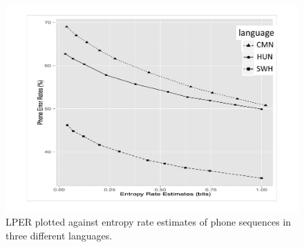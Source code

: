 \begin{figure}[t!]
  \centerline{\includegraphics[width=5.5in]{../figs/ptperfigure.pdf}}
  \vspace*{-1cm}
  \caption{LPER plotted against entropy rate estimates of phone sequences in three different languages.}
\label{fig:listPER}
\end{figure}

